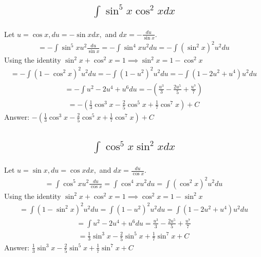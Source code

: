 \documentclass{article}
\begin{document}
\subsection{
	\begin{align*}
		\int{\sin^5{x} \cos^2{x} dx}
	\end{align*}
}
Let $u = \cos{x}, du = -\sin{x} dx,$ and $dx = -\frac{du}{\sin{x}}$. 
\begin{align*}
	= -\int{\sin^5{x} u^2 \frac{du}{\sin{x}}} = -\int{\sin^4{x} u^2 du} = -\int{(\sin^2{x})^2 u^2 du}
\end{align*}
Using the identity $\sin^2{x} + \cos^2{x} = 1 \implies \sin^2{x} = 1 - \cos^2{x}$
\begin{align*}
	= -\int{(1 - \cos^2{x})^2 u^2 du} = -\int{(1 - u^2)^2 u^2 du} = -\int{(1 - 2u^2 + u^4) u^2 du}
\end{align*}
\begin{align*}
	= -\int{u^2 - 2u^4 + u^6 du} = -\left(\frac{u^3}{3} - \frac{2u^5}{5} + \frac{u^7}{7}\right)
\end{align*}
\begin{align*}
	= - \left( \frac{1}{3}\cos^3{x} - \frac{2}{5}\cos^5{x} + \frac{1}{7} \cos^7{x} \right) + C
\end{align*}
Answer: $- \left( \frac{1}{3}\cos^3{x} - \frac{2}{5}\cos^5{x} + \frac{1}{7} \cos^7{x} \right) + C$

\subsection{
	\begin{align*}
		\int{\cos^5{x} \sin^2{x} dx}
	\end{align*}
}
Let $u = \sin{x}, du = \cos{x}dx,$ and $dx = \frac{du}{\cos{x}}$.
\begin{align*}
	= \int{\cos^5{x}u^2 \frac{du}{\cos{x}}} = \int{\cos^4{x} u^2 du} = \int{\left( \cos^2{x} \right)^2 u^2 du}
\end{align*}
Using the identity $\sin^2{x} + \cos^2{x} = 1 \implies \cos^2{x} = 1 - \sin^2{x}$
\begin{align*}
	= \int{ \left(1 - \sin^2{x} \right)^2 u^2 du} = \int{(1 - u^2)^2 u^2 du} = \int{(1 - 2u^2 + u^4) u^2 du}
\end{align*}
\begin{align*}
	= \int{u^2 - 2u^4 + u^6 du} = \frac{u^3}{3} - \frac{2u^5}{5} + \frac{u^7}{7}
\end{align*}
\begin{align*}
	= \frac{1}{3} \sin^3{x} - \frac{2}{5} \sin^5{x} + \frac{1}{7} \sin^7{x} + C
\end{align*}
Answer: $\frac{1}{3} \sin^3{x} - \frac{2}{5} \sin^5{x} + \frac{1}{7} \sin^7{x} + C$
\end{document}
